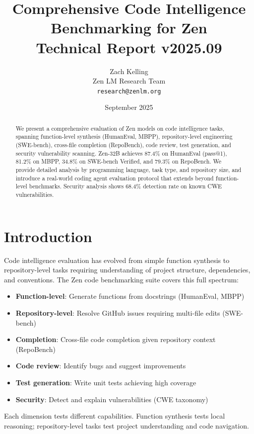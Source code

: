 \documentclass[11pt,a4paper]{article}
\title{\textbf{Comprehensive Code Intelligence Benchmarking for Zen}\\
\large Technical Report v2025.09}
\author{Zach Kelling \\ Zen LM Research Team\\
\texttt{research@zenlm.org}}
\date{September 2025}
\begin{document}
\maketitle

\begin{abstract}
We present a comprehensive evaluation of Zen models on code intelligence tasks,
spanning function-level synthesis (HumanEval, MBPP), repository-level engineering
(SWE-bench), cross-file completion (RepoBench), code review, test generation, and
security vulnerability scanning. Zen-32B achieves 87.4\% on HumanEval (pass@1),
81.2\% on MBPP, 34.8\% on SWE-bench Verified, and 79.3\% on RepoBench. We provide
detailed analysis by programming language, task type, and repository size, and
introduce a real-world coding agent evaluation protocol that extends beyond
function-level benchmarks. Security analysis shows 68.4\% detection rate on
known CWE vulnerabilities.
\end{abstract}

\section{Introduction}

Code intelligence evaluation has evolved from simple function synthesis to
repository-level tasks requiring understanding of project structure, dependencies,
and conventions. The Zen code benchmarking suite covers this full spectrum:

\begin{itemize}
  \item \textbf{Function-level}: Generate functions from docstrings (HumanEval, MBPP)
  \item \textbf{Repository-level}: Resolve GitHub issues requiring multi-file edits (SWE-bench)
  \item \textbf{Completion}: Cross-file code completion given repository context (RepoBench)
  \item \textbf{Code review}: Identify bugs and suggest improvements
  \item \textbf{Test generation}: Write unit tests achieving high coverage
  \item \textbf{Security}: Detect and explain vulnerabilities (CWE taxonomy)
\end{itemize}

Each dimension tests different capabilities. Function synthesis tests local
reasoning; repository-level tasks test project understanding and code navigation.
\end{document}
